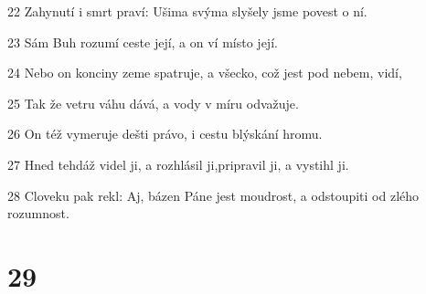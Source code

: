 \par 22 Zahynutí i smrt praví: Ušima svýma slyšely jsme povest o ní.
\par 23 Sám Buh rozumí ceste její, a on ví místo její.
\par 24 Nebo on konciny zeme spatruje, a všecko, což jest pod nebem, vidí,
\par 25 Tak že vetru váhu dává, a vody v míru odvažuje.
\par 26 On též vymeruje dešti právo, i cestu blýskání hromu.
\par 27 Hned tehdáž videl ji, a rozhlásil ji,pripravil ji, a vystihl ji.
\par 28 Cloveku pak rekl: Aj, bázen Páne jest moudrost, a odstoupiti od zlého rozumnost.

\chapter{29}

